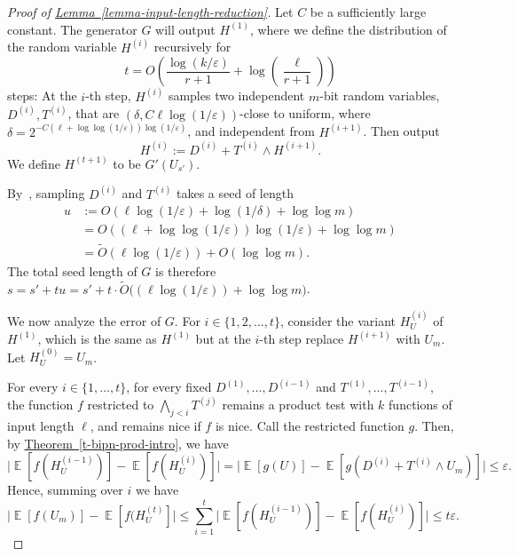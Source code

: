 \documentclass[11pt]{article}
\numberwithin{equation}{section}
\theoremstyle{definition}
\theoremstyle{plain}
\newcommand{\expref}[2]{\hyperref[#2]{#1~\ref{#2}}}
\def\eps{\varepsilon}
\def\Blocklength{\ell}
\DeclareMathOperator*{\E}{\mathbb{E}}                 %
\begin{document}
	\begin{proof}[Proof of {\expref{Lemma}{lemma-input-length-reduction}}]
    Let $C$ be a sufficiently large constant.
    The generator $G$ will output $H^{(1)}$, where we define the distribution of the random variable $H^{(i)}$ recursively
    for
    \[
      t = O \left( \frac{\log(k/\eps)}{r+1} + \log\left(\frac{\Blocklength}{r+1}\right) \right)
    \]
    steps:
    At the $i$-th step, $H^{(i)}$ samples two independent 
    $m$-bit  %
    random variables, $D^{(i)}, T^{(i)}$, %
    that are
    $(\delta, C \Blocklength \log(1/\eps))$-close to uniform, where 
$\delta = 2^{-C(\Blocklength + \log\log(1/\eps)) \log(1/\eps)}$,
    and independent from $H^{(i+1)}$.  %
    Then output 
		\[
			H^{(i)} := D^{(i)} + T^{(i)} \wedge H^{(i+1)} .
		\]
		We define $H^{(t+1)}$ to be $G'(U_{s'})$.

    By~\cite[Lemma~4.2]{NaorN93}, sampling $D^{(i)}$ and $T^{(i)}$ takes a seed of length 
    \begin{align*}
      u
      &:= O(\Blocklength \log(1/\eps) + \log(1/\delta) + \log\log m) \\
      &= O((\Blocklength + \log\log(1/\eps)) \log(1/\eps) + \log\log m) \\
      &= \tilde O(\Blocklength \log(1/\eps)) + O(\log\log m).
    \end{align*}
    The total seed length of $G$ is therefore $s = s' + tu = s' + t \cdot \tilde O\bigl( (\Blocklength \log(1/\eps)) + \log\log m \bigr)$.

    We now analyze the error of $G$.
    For $i \in \{1, 2, \ldots, t\}$, consider the variant $H^{(i)}_U$ of $H^{(1)}$, which is the same as $H^{(1)}$ but at the $i$-th step replace $H^{(i+1)}$ with $U_m$.
    Let $H^{(0)}_U = U_m$.

    For every $i \in \{1, \ldots, t\}$, for every fixed $D^{(1)}, \ldots, D^{(i-1)}$ and $T^{(1)}, \ldots, T^{(i-1)}$, the function $f$ restricted to 
    $\bigwedge_{j < i} T^{(j)}$ 
    remains a product test with $k$ functions of input length $\Blocklength$, and remains nice if $f$ is nice.  Call the restricted function $g$.
    Then, by \expref{Theorem}{t-bipn-prod-intro}, we have
    \[
      \bigl| \E[f(H_U^{(i-1)})] - \E[f(H_U^{(i)})] \bigr|
      = \bigl| \E[g(U)] - \E[g(D^{(i)} + T^{(i)} \wedge U_m)] \bigr|
			\le \eps .
    \]
		Hence, summing over $i$ we have
		\[
			\bigl| \E[f(U_m)] - \E[f(H_U^{(t)}] \bigr|
			\le \sum_{i=1}^{t} \bigl| \E[f(H_U^{(i-1)})] - \E[f(H_U^{(i)})] \bigr|
			\le t \eps.
		\]


\end{proof}
\end{document}
